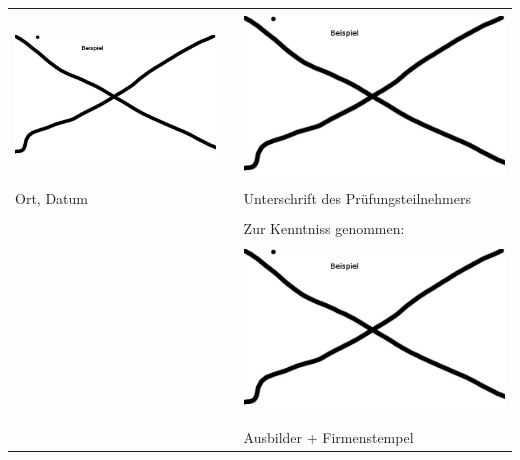 \begin{tabular}{lp{2em}l} 
\hspace{5cm}   && \hspace{4cm} \\
\includegraphics[scale=0.9]{./data/date.jpg}  &&  \includegraphics[scale=0.9]{./data/unterschrift.jpg} \\
\cline{1-1}\cline{3-3} 
Ort, Datum     && Unterschrift des Pr\"ufungsteilnehmers\\
&& \vspace{1cm} \\
&& Zur Kenntniss genommen:\\
\vspace{1cm} && \\
&& \includegraphics[scale=0.6]{./data/firmenstempel.jpg} \\
&& \hspace{4cm}\\\cline{3-3}
&& Ausbilder + Firmenstempel
\end{tabular}
